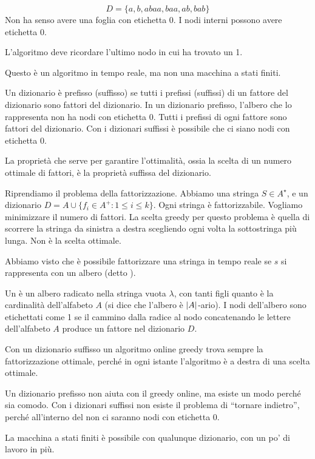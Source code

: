 \[
D = \{ a, b, abaa, baa, ab, bab \}
\]
Non ha senso avere una foglia con etichetta 0. I nodi interni possono avere etichetta 0.

L'algoritmo deve ricordare l'ultimo nodo in cui ha trovato un 1. 

Questo \`e un algoritmo in tempo reale, ma non una macchina a stati finiti.

Un dizionario \`e prefisso (suffisso) se tutti i prefissi (suffissi) di un fattore del dizionario sono fattori del dizionario. In un dizionario prefisso, l'albero che lo rappresenta non ha nodi con etichetta 0. Tutti i prefissi di ogni fattore sono fattori del dizionario. Con i dizionari suffissi \`e possibile che ci siano nodi con etichetta 0.

La propriet\`a che serve per garantire l'ottimalit\`a, ossia la scelta di un numero ottimale di fattori, \`e la propriet\`a suffissa del dizionario.

Riprendiamo il problema della fattorizzazione. Abbiamo una stringa $S \in A^{\star}$, e un dizionario $D = A \cup \{ f_i \in A^+ : 1 \le i \le k\}$. Ogni stringa \`e fattorizzabile. Vogliamo minimizzare il numero di fattori. La scelta greedy per questo problema \`e quella di scorrere la stringa da sinistra a destra scegliendo ogni volta la sottostringa pi\`u lunga. Non \`e la scelta ottimale.

Abbiamo visto che \`e possibile fattorizzare una stringa in tempo reale se $s$ si rappresenta con un albero (detto ).

\begin{defn}
Un  \`e un albero radicato nella stringa vuota $\lambda$, con tanti figli quanto \`e la cardinalit\`a dell'alfabeto $A$ (si dice che l'albero \`e $\left\lvert{A}\right\rvert$-ario). I nodi dell'albero sono etichettati come 1 se il cammino dalla radice al nodo concatenando le lettere dell'alfabeto $A$ produce un fattore nel dizionario $D$.
\end{defn}

Con un dizionario suffisso un algoritmo online greedy trova sempre la fattorizzazione ottimale, perch\'e in ogni istante l'algoritmo \`e a destra di una scelta ottimale.

Un dizionario prefisso non aiuta con il greedy online, ma esiste un modo perch\'e sia comodo. Con i dizionari suffissi non esiste il problema di ``tornare indietro'', perch\'e all'interno del  non ci saranno nodi con etichetta 0.

La macchina a stati finiti \`e possibile con qualunque dizionario, con un po' di lavoro in pi\`u.

